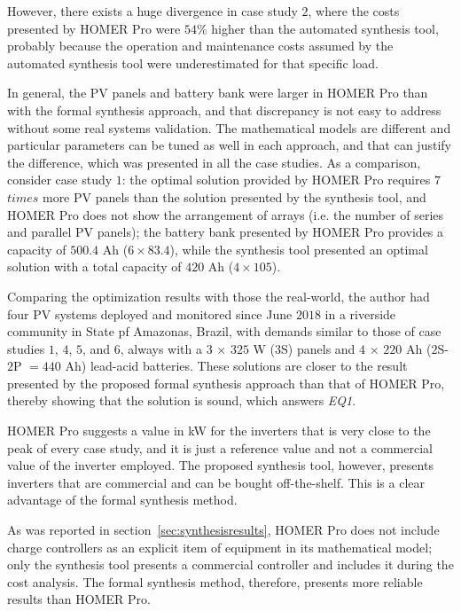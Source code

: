 However, there exists a huge divergence in case study $2$, where the costs presented by HOMER Pro were $54$\% higher than the automated synthesis tool, probably because the operation and maintenance costs assumed by the automated synthesis tool were underestimated for that specific load. 

In general, the PV panels and battery bank were larger in HOMER Pro than with the formal synthesis approach, and that discrepancy is not easy to address without some real systems validation. The mathematical models are different and particular parameters can be tuned as well in each approach, and that can justify the difference, which was presented in all the case studies. As a comparison, consider case study $1$: the optimal solution provided by HOMER Pro requires $7$ $times$ more PV panels than the solution presented by the synthesis tool, and HOMER Pro does not show the arrangement of arrays (i.e. the number of series and parallel PV panels); the battery bank presented by HOMER Pro provides a capacity of $500.4$ Ah ($6 \times 83.4$), while the synthesis tool presented an optimal solution with a total capacity of $420$ Ah ($4 \times 105$). 

Comparing the optimization results with those the real-world, the author had four PV systems deployed and monitored since June $2018$ in a riverside community in State pf Amazonas, Brazil, with demands  similar to those of case studies $1$, $4$, $5$, and $6$, always with a $3$ $\times$ $325$ W ($3$S) panels and $4$ $\times$ $220$ Ah ($2$S-$2$P $= 440$ Ah) lead-acid batteries. These solutions are closer to the result presented by the proposed formal synthesis approach than that of HOMER Pro, thereby showing that the solution is sound, which answers \textit{EQ1}.

HOMER Pro suggests a value in kW for the inverters that is very close to the peak of every case study, and it is just a reference value and not a commercial value of the inverter employed. The proposed synthesis tool, however, presents inverters that are commercial and can be bought off-the-shelf. This is a clear advantage of the formal synthesis method.

As was reported in section~\ref{sec:synthesisresults}, HOMER Pro does not include charge controllers as an explicit item of equipment in its mathematical model; only the synthesis tool presents a commercial controller and includes it during the cost analysis. The formal synthesis method, therefore, presents more reliable results than HOMER Pro.

